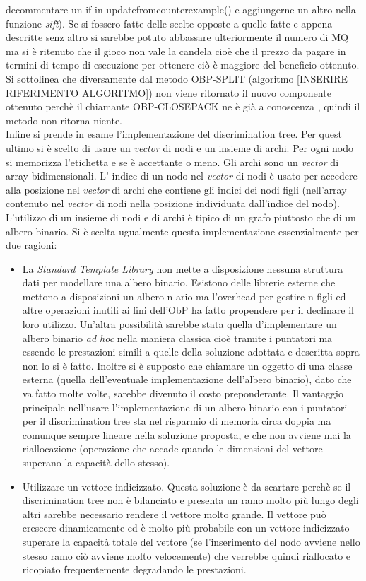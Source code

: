 decommentare un if  in update\textunderscore{}from\textunderscore{}counterexample() e aggiungerne un altro nella funzione \textit{sift}). Se si fossero fatte delle scelte opposte a quelle fatte e appena descritte senz altro si sarebbe potuto abbassare ulteriormente il numero di \ac{MQ} ma si è ritenuto che il gioco non vale la candela cioè che il prezzo da pagare in termini di tempo di esecuzione per ottenere ciò è maggiore del beneficio ottenuto.\\
Si sottolinea che diversamente dal metodo OBP-SPLIT (algoritmo [INSERIRE RIFERIMENTO ALGORITMO]) non viene ritornato il nuovo componente ottenuto perchè il chiamante OBP-CLOSEPACK ne è già a conoscenza , quindi il metodo non ritorna niente.\\
Infine si prende in esame l'implementazione del discrimination tree. Per quest ultimo si è scelto di usare un \textit{vector} di nodi e un insieme di archi. Per ogni nodo si memorizza l'etichetta e se è accettante o meno. Gli archi sono un \textit{vector} di array bidimensionali. L' indice di un nodo nel \textit{vector} di nodi è usato per accedere alla posizione nel \textit{vector} di archi che contiene gli indici dei nodi figli (nell'array contenuto nel \textit{vector} di nodi nella posizione individuata dall'indice del nodo). L'utilizzo di un insieme di nodi e di archi è tipico di un grafo piuttosto che di un albero binario. Si è scelta ugualmente questa implementazione essenzialmente per due ragioni:
\begin{itemize}
\item La \textit{Standard Template Library} non mette a disposizione nessuna struttura dati per modellare una albero binario. Esistono delle librerie esterne che mettono a disposizioni un albero n-ario ma l'overhead per gestire n figli ed altre operazioni inutili ai fini dell'\ac{ObP} ha fatto propendere per il declinare il loro utilizzo. Un'altra possibilità sarebbe stata quella d'implementare un albero binario \textit{ad hoc} nella maniera classica cioè tramite i puntatori ma essendo le prestazioni simili a quelle della soluzione adottata e descritta sopra non lo si è fatto. Inoltre si è supposto che chiamare un oggetto di una classe esterna (quella dell'eventuale implementazione dell'albero binario), dato che va fatto molte volte, sarebbe divenuto il costo preponderante. Il vantaggio principale nell'usare l'implementazione di un albero binario con i puntatori per il discrimination tree sta nel risparmio di memoria circa doppia ma comunque sempre lineare nella soluzione proposta, e che non avviene mai la riallocazione (operazione che accade quando le dimensioni del vettore superano la capacità dello stesso).
\item Utilizzare un vettore indicizzato. Questa soluzione è da scartare perchè se il discrimination tree non è bilanciato e presenta un ramo molto più lungo degli altri sarebbe necessario rendere il vettore molto grande. Il vettore può crescere dinamicamente ed è molto più probabile con un vettore indicizzato superare la capacità totale del vettore (se l'inserimento del nodo avviene nello stesso ramo ciò avviene molto velocemente) che verrebbe quindi riallocato e ricopiato frequentemente degradando le prestazioni.
\end{itemize} 
  